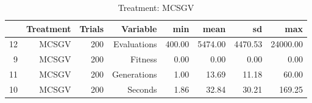 \begin{table}[ht]
\centering
\begin{tabular}{rrrrrrrr}
  \hline
 & Treatment & Trials & Variable & min & mean & sd & max \\ 
  \hline
12 & MCSGV & 200 & Evaluations & 400.00 & 5474.00 & 4470.53 & 24000.00 \\ 
  9 & MCSGV & 200 & Fitness & 0.00 & 0.00 & 0.00 & 0.00 \\ 
  11 & MCSGV & 200 & Generations & 1.00 & 13.69 & 11.18 & 60.00 \\ 
  10 & MCSGV & 200 & Seconds & 1.86 & 32.84 & 30.21 & 169.25 \\ 
   \hline
\end{tabular}
\caption{Treatment: MCSGV} 
\end{table}
